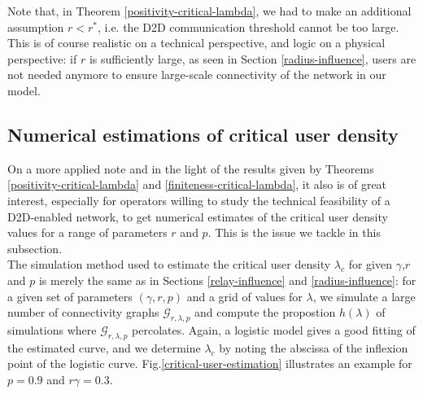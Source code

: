 \documentclass[conference]{IEEEtran}
\begin{document}
\vspace{1\baselineskip}

Note that, in Theorem \ref{positivity-critical-lambda}, we had to make an additional assumption $r < r^{*}$, i.e. the D2D communication threshold cannot be too large. This is of course realistic on a technical perspective, and logic on a physical perspective: if $r$ is sufficiently large, as seen in Section \ref{radius-influence}, users are not needed anymore to ensure large-scale connectivity of the network in our model. 

\subsection{Numerical estimations of critical user density}
On a more applied note and in the light of the results given by Theorems \ref{positivity-critical-lambda} and \ref{finiteness-critical-lambda}, it also is of great interest, especially for operators willing to study the technical feasibility of a D2D-enabled network, to get numerical estimates of the critical user density values for a range of parameters $r$ and $p$. This is the issue we tackle in this subsection. \\
\indent The simulation method used to estimate the critical user density $\lambda_{c}$ for given $\gamma$,$r$ and $p$ is merely the same as in Sections \ref{relay-influence} and \ref{radius-influence}: for a given set of parameters $(\gamma,r,p)$ and a grid of values for $\lambda$, we simulate a large number of connectivity graphs $\mathcal{G}_{r,\lambda,p}$ and compute the propostion $h(\lambda)$ of simulations where $\mathcal{G}_{r,\lambda,p}$ percolates. Again, a logistic model gives a good fitting of the estimated curve, and we determine $\lambda_{c}$ by noting the abscissa of the inflexion point of the logistic curve. Fig.\ref{critical-user-estimation} illustrates an example for $p=0.9$ and $r\gamma= 0.3$. 
\end{document}
